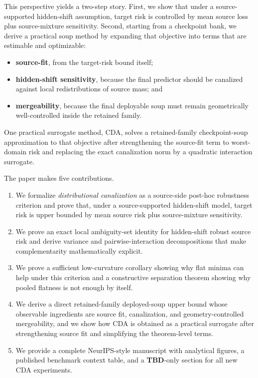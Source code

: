 \documentclass{article}
\theoremstyle{definition}
\newcommand{\TBD}{\textbf{TBD}}
\newcommand{\cda}{\textup{\textsc{CDA}}}
\begin{document}
This perspective yields a two-step story. First, we show that under a source-supported hidden-shift assumption, target risk is controlled by mean source loss plus source-mixture sensitivity. Second, starting from a checkpoint bank, we derive a practical soup method by expanding that objective into terms that are estimable and optimizable:
\begin{itemize}[leftmargin=1.3em]
    \item \textbf{source-fit}, from the target-risk bound itself;
    \item \textbf{hidden-shift sensitivity}, because the final predictor should be canalized against local redistributions of source mass; and
    \item \textbf{mergeability}, because the final deployable soup must remain geometrically well-controlled inside the retained family.
\end{itemize}
One practical surrogate method, \cda{}, solves a retained-family checkpoint-soup approximation to that objective after strengthening the source-fit term to worst-domain risk and replacing the exact canalization norm by a quadratic interaction surrogate.

The paper makes five contributions.
\begin{enumerate}[leftmargin=1.4em]
    \item We formalize \emph{distributional canalization} as a source-side post-hoc robustness criterion and prove that, under a source-supported hidden-shift model, target risk is upper bounded by mean source risk plus source-mixture sensitivity.
    \item We prove an exact local ambiguity-set identity for hidden-shift robust source risk and derive variance and pairwise-interaction decompositions that make complementarity mathematically explicit.
    \item We prove a sufficient low-curvature corollary showing why flat minima can help under this criterion and a constructive separation theorem showing why pooled flatness is not enough by itself.
    \item We derive a direct retained-family deployed-soup upper bound whose observable ingredients are source fit, canalization, and geometry-controlled mergeability, and we show how \cda{} is obtained as a practical surrogate after strengthening source fit and simplifying the theorem-level terms.
    \item We provide a complete NeurIPS-style manuscript with analytical figures, a published benchmark context table, and a \TBD{}-only section for all new \cda{} experiments.
\end{enumerate}
\end{document}
